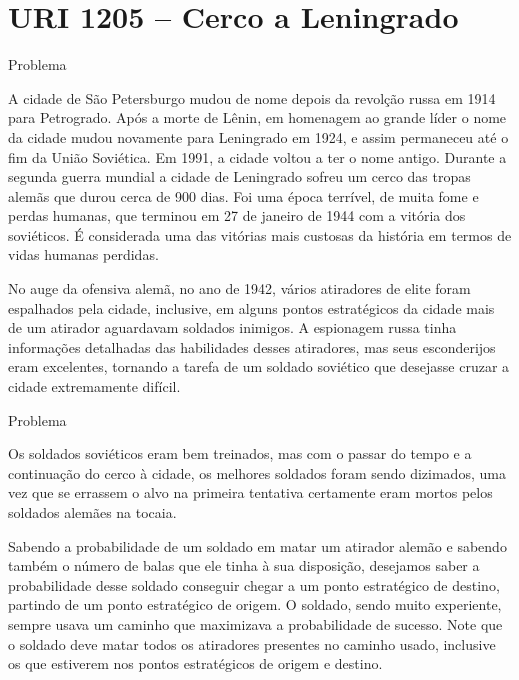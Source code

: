 \section{URI 1205 -- Cerco a Leningrado}

\begin{frame}[fragile]{Problema}

A cidade de São Petersburgo mudou de nome depois da revolção russa em 1914 para Petrogrado. Após a morte de Lênin, em homenagem ao grande líder o nome da cidade mudou novamente para Leningrado em 1924, e assim permaneceu até o fim da União Soviética. Em 1991, a cidade voltou a ter o nome antigo. Durante a segunda guerra mundial a cidade de Leningrado sofreu um cerco das tropas alemãs que durou cerca de 900 dias. Foi uma época terrível, de muita fome e perdas humanas, que terminou em 27 de janeiro de 1944 com a vitória dos soviéticos. É considerada uma das vitórias mais custosas da história em termos de vidas humanas perdidas.

No auge da ofensiva alemã, no ano de 1942, vários atiradores de elite foram espalhados pela cidade, inclusive, em alguns pontos estratégicos da cidade mais de um atirador aguardavam soldados inimigos. A espionagem russa tinha informações detalhadas das habilidades desses atiradores, mas seus esconderijos eram excelentes, tornando a tarefa de um soldado soviético que desejasse cruzar a cidade extremamente difícil. 

\end{frame}

\begin{frame}[fragile]{Problema}

Os soldados soviéticos eram bem treinados, mas com o passar do tempo e a continuação do cerco à cidade, os melhores soldados foram sendo dizimados, uma vez que se errassem o alvo na primeira tentativa certamente eram mortos pelos soldados alemães na tocaia.

Sabendo a probabilidade de um soldado em matar um atirador alemão e sabendo também o número de balas que ele tinha à sua disposição, desejamos saber a probabilidade desse soldado conseguir chegar a um ponto estratégico de destino, partindo de um ponto estratégico de origem. O soldado, sendo muito experiente, sempre usava um caminho que maximizava a probabilidade de sucesso. Note que o soldado deve matar todos os atiradores presentes no caminho usado, inclusive os que estiverem nos pontos estratégicos de origem e destino.

\end{frame}

